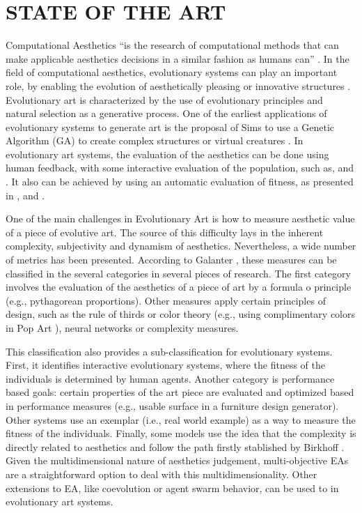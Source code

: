\documentclass[a4paper,twoside]{article}
\begin{document}
\section{\uppercase{STATE OF THE ART}}
\label{sec:soa}
\noindent Computational Aesthetics ``is the research of computational methods that can make applicable aesthetics decisions in a similar fashion as humans can'' \cite{COMPAESTH}. In the field of computational aesthetics, evolutionary systems can play an important role, by enabling the evolution of aesthetically pleasing or innovative structures \cite{dipaola2009incorporating}. Evolutionary art is characterized by the use of evolutionary principles and natural selection as a generative process. One of the earliest applications of evolutionary systems to generate art is the proposal of Sims to use a Genetic Algorithm (GA) to create complex structures \cite{sims1991artificial} or virtual creatures  \cite{sims1994evolving}. In evolutionary art systems, the evaluation of the aesthetics can be done using human feedback, with some interactive evaluation of the population, such as, \cite{ashlock2006evolutionary,draves2006electric,moroni2000vox,sims1991artificial} and \cite{takagi2001interactive}. It also can be achieved by using an automatic evaluation of fitness, as presented in \cite{aguilar2008robotic,del2005benford,den2010comparing,dipaola2009incorporating,li2012investigating,machado1998computing}, and \cite{sims1994evolving}.

One of the main challenges in Evolutionary Art is how to measure aesthetic value of a piece of evolutive art. The source of this difficulty lays in the inherent complexity, subjectivity and dynamism of aesthetics. Nevertheless, a wide number of metrics has been presented. According to Galanter \cite{galanter2012computational}, these measures can be classified in the several categories in several pieces of research. The first category involves the evaluation of the aesthetics of a piece of art by a formula o principle (e.g., pythagorean proportions). Other measures apply certain principles of design, such as the rule of thirds or color theory (e.g., using complimentary colors in Pop Art \cite{den2012evolving}), neural networks or complexity measures. 

This classification also provides a sub-classification for evolutionary systems. First, it identifies interactive evolutionary systems, where the fitness of the individuals is determined by human agents. Another category is performance based goals: certain properties of the art piece are evaluated and optimized based in performance measures (e.g., usable surface in a furniture design generator). Other systems use an exemplar (i.e., real world example) as a way to measure the fitness of the individuals. Finally, some models use the idea that the complexity is directly related to aesthetics and follow the path firstly stablished by Birkhoff \cite{birkhoff2003aesthetic}.  Given the multidimensional nature of aesthetics judgement, multi-objective EAs are a straightforward option to deal with this multidimensionality. Other extensions to EA, like coevolution or agent swarm behavior, can be used to in evolutionary art systems.
\end{document}
